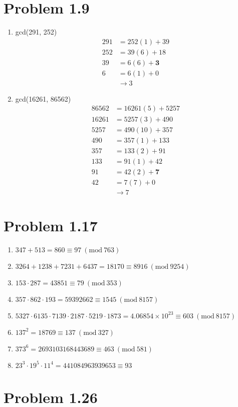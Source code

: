 \documentclass{article}
\newcommand{\Mod}[1]{\ (\mathrm{mod}\ #1)}
\begin{document}
\section*{Problem 1.9}
\begin{enumerate}[label=(\alph*)]
    \item gcd(291, 252)
          \begin{align*}
              291 & = 252 (1) + 39       \\
              252 & = 39 (6) + 18        \\
              39  & = 6 (6) + \mathbf{3} \\
              6   & = 6 (1) + 0          \\
                  & \rightarrow 3
          \end{align*}
    \item gcd(16261, 86562)
          \begin{align*}
              86562 & = 16261 (5) + 5257    \\
              16261 & = 5257 (3) + 490      \\
              5257  & = 490 (10) + 357      \\
              490   & = 357 (1) + 133       \\
              357   & = 133 (2) + 91        \\
              133   & = 91 (1) + 42         \\
              91    & = 42 (2) + \mathbf{7} \\
              42    & = 7 (7) + 0           \\
                    & \rightarrow 7
          \end{align*}
\end{enumerate}
\section*{Problem 1.17}
\begin{enumerate}[label=(\alph*)]
    \item \(347 + 513 = 860 \equiv 97 \Mod{763}\)
    \item \(3264 + 1238 + 7231 + 6437 = 18170 \equiv 8916 \Mod{9254}\)
    \item \(153 \cdot 287 = 43851 \equiv 79 \Mod{353}\)
    \item \(357 \cdot 862 \cdot 193 = 59392662 \equiv 1545\Mod{8157}\)
    \item \(5327 \cdot 6135 \cdot 7139 \cdot 2187 \cdot 5219 \cdot 1873 = 4.06854 \times 10^{23} \equiv 603\Mod{8157}\)
    \item \(137^2 = 18769 \equiv 137 \Mod{327}\)
    \item \(373^6 = 2693103168443689 \equiv 463 \Mod{581}\)
    \item \(23^3 \cdot 19^5 \cdot 11^4 = 441084963939653 \equiv 93\)
\end{enumerate}
\section*{Problem 1.26}
\end{document}
